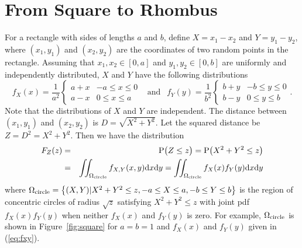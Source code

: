 \documentclass[12pt,draftclsnofoot,onecolumn]{IEEEtran}
\begin{document}
\section{From Square to Rhombus}
For a rectangle with sides of lengths $a$ and $b$, define $X=x_1-x_2$ and
$Y=y_1-y_2$, where $(x_1, y_1)$ and $(x_2, y_2)$ are the coordinates of two
random points in the rectangle.
Assuming that $x_1, x_2 \in [0,a]$ and $y_1, y_2 \in [0, b]$ are uniformly and independently distributed,
$X$ and $Y$ have the following distributions
\begin{equation}\label{eq:fxy}
  f_X(x)=\frac{1}{a^2}\left\{
    \begin{array}{lr}
      a+x & -a\leq x \leq 0 \\
      a-x & 0 \leq x \leq a
    \end{array}
  \right.
  ~~\mbox{ and }~~ f_Y(y)=\frac{1}{b^2}\left\{
    \begin{array}{lr}
      b+y & -b\leq y \leq 0 \\
      b-y & 0 \leq y \leq b
    \end{array}
  \right..
\end{equation}
%
Note that the distributions of $X$ and $Y$ are independent.
The distance between $(x_1, y_1)$ and $(x_2, y_2)$ is $D=\sqrt{X^2+Y^2}$.
Let the squared distance be $Z=D^2=X^2+Y^2$.
Then we have the distribution
\begin{eqnarray}\label{eq-rec}
F_Z(z)&=& {\rm P}\big(Z \leq z \big) = {\rm P}\big(X^2+Y^2 \leq z \big)\nonumber\\
&=&\iint_{\Omega_{\rm circle}}f_{X,Y}(x,y){\rm d}x{\rm d}y=
\iint_{\Omega_{\rm circle}}f_X(x)f_Y(y){\rm d}x{\rm d}y
\end{eqnarray}
where $\Omega_{\rm circle}=\left\{(X,Y)|X^2+Y^2\leq z, -a \leq X \leq a, -b \leq Y \leq b\right\}$
is the region of concentric circles of radius $\sqrt{z}$ satisfying $X^2+Y^2\leq z$
with joint pdf $f_X(x)f_Y(y)$ when neither $f_X(x)$ and $f_Y(y)$ is zero.
For example, $\Omega_{\rm circle}$ is shown in Figure~\ref{fig:square} for
$a=b=1$ and $f_X(x)$ and $f_Y(y)$ given in (\ref{eq:fxy}).
\end{document}
